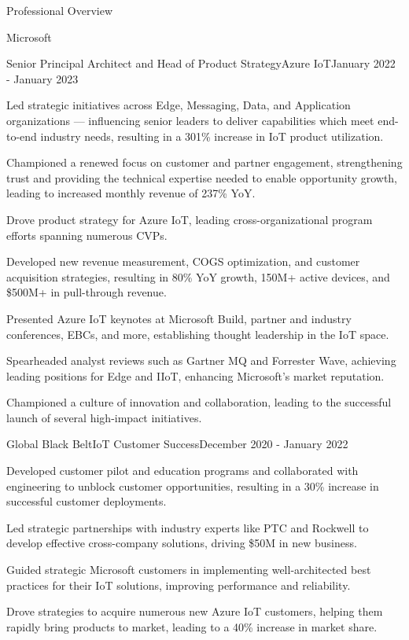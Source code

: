 \documentclass{resume} %
\begin{document}
\begin{rSection}{Professional Overview}
\begin{rCompany}{Microsoft}{}{}
\begin{rSubSubsection}{Senior Principal Architect and Head of Product Strategy}{Azure IoT}{January 2022 - January 2023}
        \item Led strategic initiatives across Edge, Messaging, Data, and Application organizations --- influencing senior leaders to deliver capabilities which meet end-to-end industry needs, resulting in a 301\% increase in IoT product utilization.
        \item Championed a renewed focus on customer and partner engagement, strengthening  trust and providing the technical expertise needed to enable opportunity growth, leading to increased monthly revenue of 237\% YoY.
        \item Drove product strategy for Azure IoT, leading cross-organizational program efforts spanning numerous CVPs.
        \item Developed new revenue measurement, COGS optimization, and customer acquisition strategies, resulting in 80\% YoY growth, 150M+ active devices, and \$500M+ in pull-through revenue.
        \item Presented Azure IoT keynotes at Microsoft Build, partner and industry conferences, EBCs, and more, establishing thought leadership in the IoT space.
        \item Spearheaded analyst reviews such as Gartner MQ and Forrester Wave, achieving leading positions for Edge and IIoT, enhancing Microsoft's market reputation.
        \item Championed a culture of innovation and collaboration, leading to the successful launch of several high-impact initiatives.
    
    \end{rSubSubsection}
    
    \begin{rSubSubsection}{Global Black Belt}{IoT Customer Success}{December 2020 - January 2022}
        \item Developed customer pilot and education programs and collaborated with engineering to unblock customer opportunities, resulting in a 30\% increase in successful customer deployments.
        \item Led strategic partnerships with industry experts like PTC and Rockwell to develop effective cross-company solutions, driving \$50M in new business.
        \item Guided strategic Microsoft customers in implementing well-architected best practices for their IoT solutions, improving performance and reliability.
        \item Drove strategies to acquire numerous new Azure IoT customers, helping them rapidly bring products to market, leading to a 40\% increase in market share.
    \end{rSubSubsection}
    

\end{rCompany}
\end{rSection}
\end{document}
